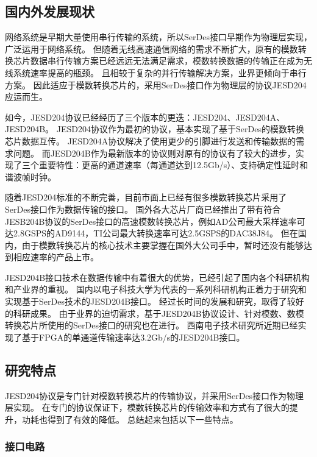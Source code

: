 \documentclass[UTF8]{ctexart}
\begin{document}
\subsection{国内外发展现状}

网络系统是早期大量使用串行传输的系统，所以SerDes接口早期作为物理层实现，广泛运用于网络系统。
但随着无线高速通信网络的需求不断扩大，原有的模数转换芯片数据串行传输方案已经远远无法满足需求，模数转换数据的传输正在成为无线系统速率提高的瓶颈。
且相较于复杂的并行传输解决方案，业界更倾向于串行方案。
因此适应于模数转换芯片的，采用SerDes接口作为物理层的协议JESD204应运而生。

如今，JESD204协议已经经历了三个版本的更迭：JESD204、JESD204A、JESD204B。
JESD204协议作为最初的协议，基本实现了基于SerDes的模数转换芯片数据互传。
JESD204A协议解决了使用更少的引脚进行发送和传输数据的需求问题。
而JESD204B作为最新版本的协议则对原有的协议有了较大的进步，实现了三个重要特性：更高的通道速率（每通道达到12.5Gb/s）、支持确定性延时和谐波帧时钟。\cite{Beavers2014}

随着JESD204标准的不断完善，目前市面上已经有很多模数转换芯片采用了SerDes接口作为数据传输的接口。
国外各大芯片厂商已经推出了带有符合JESB204B协议的SerDes接口的高速模数转换芯片，例如AD公司最大采样速率可达2.8GSPS的AD9144\cite{ad9144AD}，TI公司最大转换速率可达2.5GSPS的DAC38J84\cite{DAC38J84TI}。
但在国内，由于模数转换芯片的核心技术主要掌握在国外大公司手中，暂时还没有能够达到相应速率的产品上市。

JESD204B接口技术在数据传输中有着很大的优势，已经引起了国内各个科研机构和产业界的重视。
国内以电子科技大学为代表的一系列科研机构正着力于研究和实现基于SerDes技术的JESD204B接口。
经过长时间的发展和研究，取得了较好的科研成果。
由于业界的迫切需求，基于JESD204B协议设计、针对模数、数模转换芯片所使用的SerDes接口的研究也在进行。
西南电子技术研究所近期已经实现了基于FPGA的单通道传输速率达3.2Gb/s的JESD204B接口\cite{zhangf2014}。

\subsection{研究特点}

JESD204协议是专门针对模数转换芯片的传输协议，并采用SerDes接口作为物理层实现。
在专门的协议保证下，模数转换芯片的传输效率和方式有了很大的提升，功耗也得到了有效的降低。
总结起来包括以下一些特点。

\subsubsection{接口电路}
\end{document}
